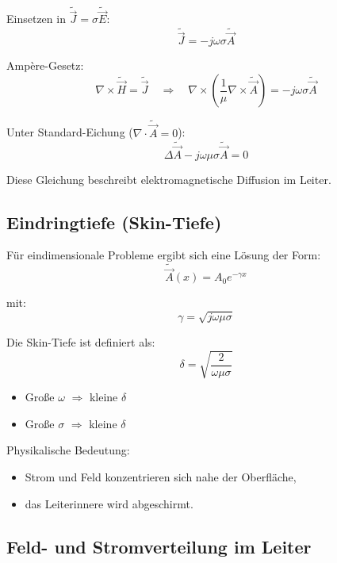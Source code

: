\documentclass[a4paper]{article}
\newcommand{\E}{\vec E}
\newcommand{\Hf}{\vec H}
\newcommand{\J}{\vec J}
\newcommand{\A}{\vec A}
\begin{document}
Einsetzen in $\tilde{\J}=\sigma\tilde{\E}$:
\[
\tilde{\J} = -j\omega\sigma \tilde{\A}
\]

Amp\`ere-Gesetz:
\[
\nabla \times \tilde{\Hf} = \tilde{\J}
\quad \Rightarrow \quad
\nabla \times \left(\frac{1}{\mu}\nabla \times \tilde{\A}\right)
= -j\omega\sigma \tilde{\A}
\]

Unter Standard-Eichung ($\nabla\cdot\tilde{\A}=0$):
\[
\Delta \tilde{\A} - j\omega\mu\sigma \tilde{\A} = 0
\]

\begin{schema}
Diese Gleichung beschreibt elektromagnetische Diffusion im Leiter.
\end{schema}

\subsection{Eindringtiefe (Skin-Tiefe)}

Für eindimensionale Probleme ergibt sich eine Lösung der Form:
\[
\tilde{\A}(x) = A_0 e^{-\gamma x}
\]

mit:
\[
\gamma = \sqrt{j\omega\mu\sigma}
\]

Die Skin-Tiefe ist definiert als:
\[
\delta = \sqrt{\frac{2}{\omega\mu\sigma}}
\]

\begin{merke}
\begin{itemize}
  \item Große $\omega$ $\Rightarrow$ kleine $\delta$
  \item Große $\sigma$ $\Rightarrow$ kleine $\delta$
\end{itemize}
\end{merke}

Physikalische Bedeutung:
\begin{itemize}
  \item Strom und Feld konzentrieren sich nahe der Oberfläche,
  \item das Leiterinnere wird abgeschirmt.
\end{itemize}

\subsection{Feld- und Stromverteilung im Leiter}
\end{document}
